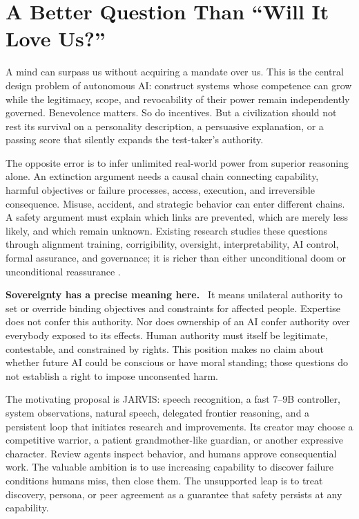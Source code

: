 \documentclass[10pt,twocolumn,letterpaper]{article}
\newcommand{\para}[1]{\par\smallskip\noindent\textbf{#1}\ }
\begin{document}
\section{A Better Question Than ``Will It Love Us?''}
\label{sec:intro}
A mind can surpass us without acquiring a mandate over us. This is the central design problem of autonomous AI: construct systems whose competence can grow while the legitimacy, scope, and revocability of their power remain independently governed. Benevolence matters. So do incentives. But a civilization should not rest its survival on a personality description, a persuasive explanation, or a passing score that silently expands the test-taker's authority.

The opposite error is to infer unlimited real-world power from superior reasoning alone. An extinction argument needs a causal chain connecting capability, harmful objectives or failure processes, access, execution, and irreversible consequence. Misuse, accident, and strategic behavior can enter different chains. A safety argument must explain which links are prevented, which are merely less likely, and which remain unknown. Existing research studies these questions through alignment training, corrigibility, oversight, interpretability, AI control, formal assurance, and governance; it is richer than either unconditional doom or unconditional reassurance \cite{iasr,aicontrol,guaranteed,safetycases}.

\para{Sovereignty has a precise meaning here.} It means unilateral authority to set or override binding objectives and constraints for affected people. Expertise does not confer this authority. Nor does ownership of an AI confer authority over everybody exposed to its effects. Human authority must itself be legitimate, contestable, and constrained by rights. This position makes no claim about whether future AI could be conscious or have moral standing; those questions do not establish a right to impose unconsented harm.

The motivating proposal is JARVIS: speech recognition, a fast 7--9B controller, system observations, natural speech, delegated frontier reasoning, and a persistent loop that initiates research and improvements. Its creator may choose a competitive warrior, a patient grandmother-like guardian, or another expressive character. Review agents inspect behavior, and humans approve consequential work. The valuable ambition is to use increasing capability to discover failure conditions humans miss, then close them. The unsupported leap is to treat discovery, persona, or peer agreement as a guarantee that safety persists at any capability.
\end{document}
